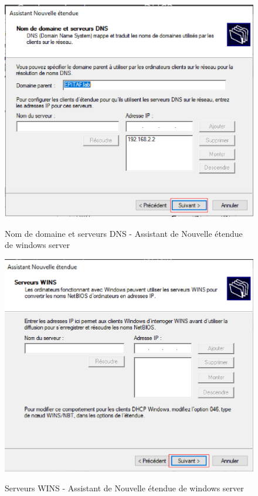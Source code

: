 \begin{figure}[h!]
	\begin{center}
		\caption{Nom de domaine et serveurs DNS - Assistant de Nouvelle étendue de windows server}
		\includegraphics[scale=0.7]{WS_Screenshots/45.png}
		\label{Funcs_WinS/17}
	\end{center}
\end{figure}
\FloatBarrier 
    

\begin{figure}[h!]
	\begin{center}
		\caption{Serveurs WINS - Assistant de Nouvelle étendue de windows server}
		\includegraphics[scale=0.7]{WS_Screenshots/46.png}
		\label{Funcs_WinS/18}
	\end{center}
\end{figure}
\FloatBarrier 
    

